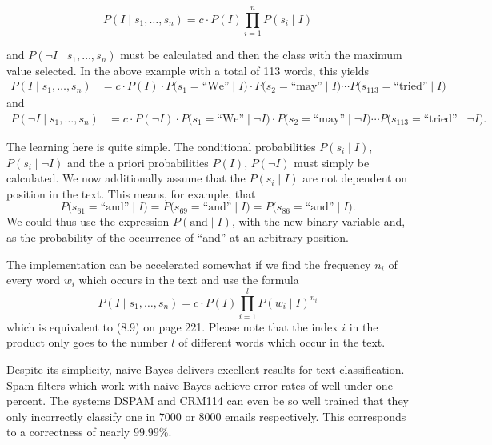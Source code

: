 \documentclass[10pt]{book}
\begin{document}
\begin{equation*}
P\left(I \mid s_{1}, \ldots, s_{n}\right)=c \cdot P(I) \prod_{i=1}^{n} P\left(s_{i} \mid I\right) \tag{8.9}
\end{equation*}

and $P\left(\neg I \mid s_{1}, \ldots, s_{n}\right)$ must be calculated and then the class with the maximum value selected. In the above example with a total of 113 words, this yields
\[
\begin{aligned}
P\left(I \mid s_{1}, \ldots, s_{n}\right)
&= c \cdot P(I) \cdot P\bigl(s_{1}=\text{``We''} \mid I\bigr) \cdot P\bigl(s_{2}=\text{``may''} \mid I\bigr) \cdots P\bigl(s_{113}=\text{``tried''} \mid I\bigr)
\end{aligned}
\]
and
\[
\begin{aligned}
P\left(\neg I \mid s_{1}, \ldots, s_{n}\right)
&= c \cdot P(\neg I) \cdot P\bigl(s_{1}=\text{``We''} \mid \neg I\bigr) \cdot P\bigl(s_{2}=\text{``may''} \mid \neg I\bigr) \cdots P\bigl(s_{113}=\text{``tried''} \mid \neg I\bigr).
\end{aligned}
\]

The learning here is quite simple. The conditional probabilities $P\left(s_{i} \mid I\right)$, $P\left(s_{i} \mid \neg I\right)$ and the a priori probabilities $P(I)$, $P(\neg I)$ must simply be calculated. We now additionally assume that the $P\left(s_{i} \mid I\right)$ are not dependent on position in the text. This means, for example, that
\[
P\bigl(s_{61}=\text{``and''} \mid I\bigr)=P\bigl(s_{69}=\text{``and''} \mid I\bigr)=P\bigl(s_{86}=\text{``and''} \mid I\bigr).
\]
We could thus use the expression $P(\text{and}\mid I)$, with the new binary variable and, as the probability of the occurrence of ``and'' at an arbitrary position.

The implementation can be accelerated somewhat if we find the frequency $n_{i}$ of every word $w_{i}$ which occurs in the text and use the formula
\begin{equation*}
P\left(I \mid s_{1}, \ldots, s_{n}\right)=c \cdot P(I) \prod_{i=1}^{l} P\left(w_{i} \mid I\right)^{n_{i}} \tag{8.10}
\end{equation*}
which is equivalent to (8.9) on page 221. Please note that the index $i$ in the product only goes to the number $l$ of different words which occur in the text.

Despite its simplicity, naive Bayes delivers excellent results for text classification. Spam filters which work with naive Bayes achieve error rates of well under one percent. The systems DSPAM and CRM114 can even be so well trained that they only incorrectly classify one in 7000 or 8000 emails respectively. This corresponds to a correctness of nearly $99.99 \%$.
\end{document}
